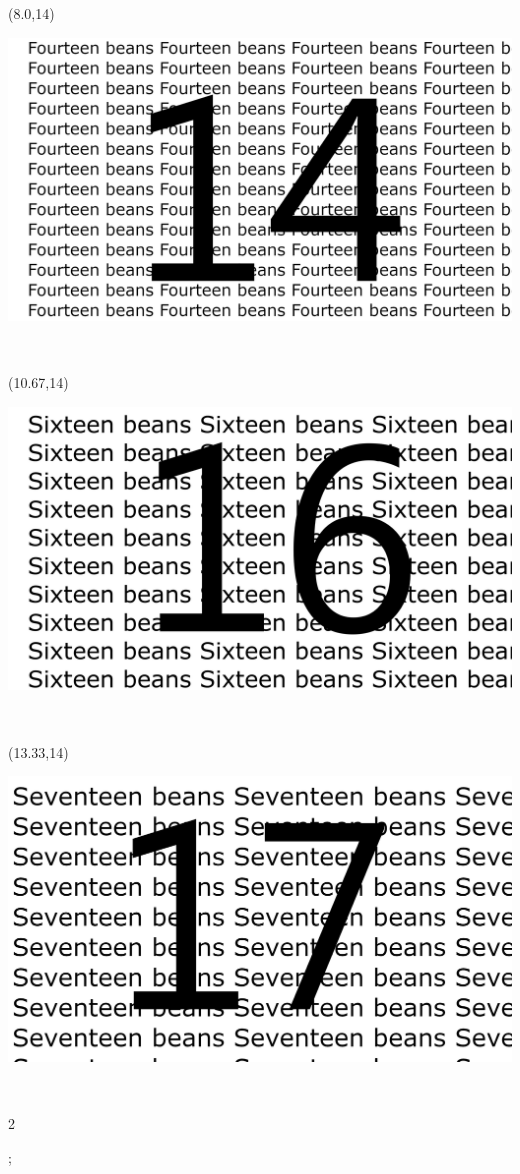\documentclass[a4paper]{article}
\newcommand{\myXseventeenBean}[0]{
\includegraphics[angle=00,height=0.057\paperheight,width=0.150\paperwidth]{seventeen_bean.png}
}
\newcommand{\myXsixteenBean}[0]{
\includegraphics[angle=00,height=0.057\paperheight,width=0.150\paperwidth]{sixteen_bean.png}
}
\newcommand{\myXfourteenBean}[0]{
\includegraphics[angle=00,height=0.057\paperheight,width=0.150\paperwidth]{fourteen_bean.png}
}
\newcommand{\mycard}[5]{%
	\vspace{0.35cm}
	\tiny #1 #2
	\parbox[t][0.058\paperheight][c]{0.150\paperwidth}{%
	\hspace{-0.65cm} \large#3\\
	}
}
\begin{document}
\begin{textblock}{2.67}(8.0,14)
\mycard{}{}{
\myXfourteenBean
}{}{} 
\end{textblock}

\begin{textblock}{2.67}(10.67,14)
\mycard{}{}{
\myXsixteenBean
}{}{} 
\end{textblock}

\begin{textblock}{2.67}(13.33,14)
\mycard{}{}{
\myXseventeenBean
}{}{} 
\end{textblock}

\begin{tiny}2\end{tiny};
\end{document}
